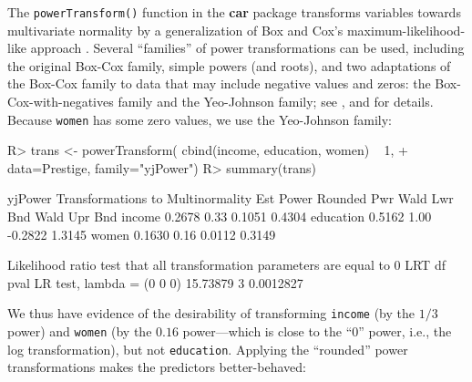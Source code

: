 \documentclass[
]{jss}
\begin{document}
The \texttt{powerTransform()} function in the \textbf{car} package
transforms variables towards multivariate normality by a generalization
of Box and Cox's maximum-likelihood-like approach \citep{BoxCox:1964}.
Several ``families'' of power transformations can be used, including the
original Box-Cox family, simple powers (and roots), and two adaptations
of the Box-Cox family to data that may include negative values and
zeros: the Box-Cox-with-negatives family and the Yeo-Johnson family; see
\citet[Chap. 8]{Weisberg:2014}, and \citet[Chap. 3]{FoxWeisberg:2019}
for details. Because \texttt{women} has some zero values, we use the
Yeo-Johnson family:

\begin{CodeChunk}
\begin{CodeInput}
R> trans <- powerTransform( cbind(income, education, women) ~ 1,
+                          data=Prestige, family="yjPower")
R> summary(trans)
\end{CodeInput}
\begin{CodeOutput}
yjPower Transformations to Multinormality 
          Est Power Rounded Pwr Wald Lwr Bnd Wald Upr Bnd
income       0.2678        0.33       0.1051       0.4304
education    0.5162        1.00      -0.2822       1.3145
women        0.1630        0.16       0.0112       0.3149

 Likelihood ratio test that all transformation parameters are equal to 0
                               LRT df      pval
LR test, lambda = (0 0 0) 15.73879  3 0.0012827
\end{CodeOutput}
\end{CodeChunk}

We thus have evidence of the desirability of transforming
\texttt{income} (by the \(1/3\) power) and \texttt{women} (by the
\(0.16\) power---which is close to the ``0'' power, i.e., the log
transformation), but not \texttt{education}. Applying the ``rounded''
power transformations makes the predictors better-behaved:
\end{document}
